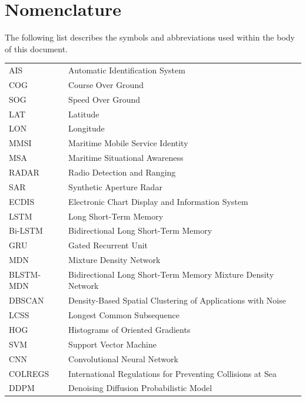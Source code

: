 \section*{Nomenclature}
The following list describes the symbols and abbreviations used within the body of this document.
\begin{longtable}{@{} p{3.5cm} p{12cm} @{}}
    AIS         & Automatic Identification System \\[4pt]
    COG         & Course Over Ground \\[4pt]
    SOG         & Speed Over Ground \\[4pt]
    LAT         & Latitude \\[4pt]
    LON         & Longitude \\[4pt]
    MMSI        & Maritime Mobile Service Identity \\[4pt]
    MSA         & Maritime Situational Awareness \\[4pt]
    RADAR       & Radio Detection and Ranging \\[4pt]
    SAR         & Synthetic Aperture Radar \\[4pt]
    ECDIS       & Electronic Chart Display and Information System \\[4pt]
    LSTM        & Long Short-Term Memory \\[4pt]
    Bi-LSTM     & Bidirectional Long Short-Term Memory \\[4pt]
    GRU         & Gated Recurrent Unit \\[4pt]
    MDN         & Mixture Density Network \\[4pt]
    BLSTM-MDN   & Bidirectional Long Short-Term Memory Mixture Density Network \\[4pt]
    DBSCAN      & Density-Based Spatial Clustering of Applications with Noise \\[4pt]
    LCSS        & Longest Common Subsequence \\[4pt]
    HOG         & Histograms of Oriented Gradients \\[4pt]
    SVM         & Support Vector Machine \\[4pt]
    CNN         & Convolutional Neural Network \\[4pt]
    COLREGS     & International Regulations for Preventing Collisions at Sea \\[4pt]
    DDPM        & Denoising Diffusion Probabilistic Model\\[4pt]

\end{longtable}